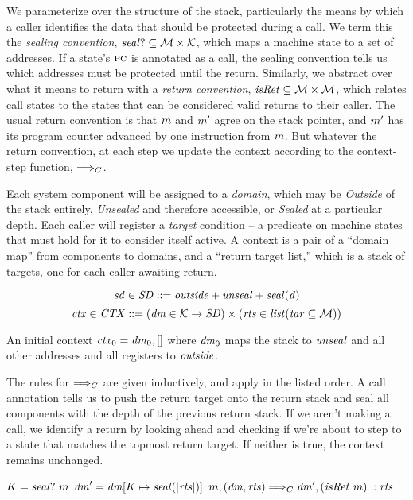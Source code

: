 \documentclass[acmsmall,review,anonymous]{acmart}\settopmatter{printfolios=true,printccs=false,printacmref=false}
\begin{document}
We parameterize over the structure of the stack, particularly the means by
which a caller identifies the data that should be protected during a call. We term
this the {\em sealing convention}, \(\mathit{seal?} \subseteq {\mathcal M} \times {\mathcal K}\), which
maps a machine state to a set of addresses.
If a state's \(\textsc{pc}\) is annotated as a call, the sealing convention tells us
which addresses must be protected until the return. Similarly, we abstract over what
it means to return with a {\em return convention}, \(\mathit{isRet} \subseteq {\mathcal M} \times {\mathcal M}\),
which relates call states to the states that can be considered valid returns to their caller.
The usual return convention is that \(m\) and \(m'\) agree on the stack pointer,
and \(m'\) has its program counter advanced by one instruction from \(m\).
But whatever the return convention, at each step we update the context according
to the context-step function, \(\Longrightarrow_C\).

Each system component will be assigned to a {\em domain}, which may be {\em Outside}
of the stack entirely, {\em Unsealed} and therefore accessible, or {\em Sealed}
at a particular depth. Each caller will register a {\em target}
condition -- a predicate on machine states that must hold for it to consider itself active.
A context is a pair of a ``domain map'' from components to domains, and a
``return target list,'' which is a stack of targets, one for each caller awaiting
return.  \ifaftersubmission{}\fi

\[\mathit{sd} \in \mathit{SD} ::= \mathit{outside} + \mathit{unseal} + \mathit{seal(d)}\]
\[\mathit{ctx} \in \mathit{CTX} ::= (\mathit{dm} \in {\mathcal K} \rightarrow \mathit{SD})
  \times (\mathit{rts} \in \mathit{list} (\mathit{tar} \subseteq {\mathcal M})) \]

An initial context \(\mathit{ctx}_0 = \mathit{dm}_0, []\) where \(\mathit{dm}_0\) maps
the stack to \(\mathit{unseal}\) and all other addresses and all registers to \(\mathit{outside}\).

The rules for \(\Longrightarrow_C\) are given inductively, and apply in the listed order.
A call annotation tells us to push the return target onto the return stack and
seal all components with the depth of the previous return stack. If we aren't making a call,
we identify a return by looking ahead and checking if we're about to step to a state
that matches the topmost return target. If neither is true, the context remains unchanged.

\judgmentthree[Call]
              {\(\codemap ~ (\mach ~ \PCname) = \callmap\)}
              {\(K = \mathit{seal?} ~ m\)}
              {\(\mathit{dm}' = \mathit{dm}[K \mapsto \mathit{seal(|\mathit{rts}|)}]\)}
                {\(m,(\mathit{dm},\mathit{rts}) \Longrightarrow_C \mathit{dm}',(\mathit{isRet} ~ m)::\mathit{rts}\)}
\end{document}
